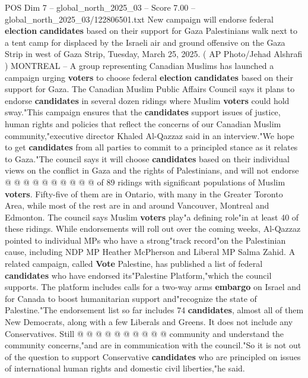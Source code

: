 \begin{textsample}{POS Dim 7 – global\_north\_2025\_03 – Score 7.00 – global\_north\_2025\_03/122806501.txt}  \label{ex:f7_pos_318}
New campaign will endorse federal \textbf{election} \textbf{candidates} based on their support for Gaza Palestinians walk next to a tent camp for displaced by the Israeli air and ground offensive on the Gaza Strip in west of Gaza Strip, Tuesday, March 25, 2025. ( AP Photo/Jehad Alshrafi ) MONTREAL -- A group representing Canadian Muslims has launched a campaign urging \textbf{voters} to choose federal \textbf{election} \textbf{candidates} based on their support for Gaza.
The Canadian Muslim Public Affairs Council says it plans to endorse \textbf{candidates} in several dozen ridings where Muslim \textbf{voters} could hold sway."This campaign ensures that the \textbf{candidates} support issues of justice, human rights and policies that reflect the concerns of our Canadian Muslim community,"executive director Khaled Al-Qazzaz said in an interview."We hope to get \textbf{candidates} from all parties to commit to a principled stance as it relates to Gaza."The council says it will choose \textbf{candidates} based on their individual views on the conflict in Gaza and the rights of Palestinians, and will not endorse @ @ @ @ @ @ @ @ @ @ of 89 ridings with significant populations of Muslim \textbf{voters}.
Fifty-five of them are in Ontario, with many in the Greater Toronto Area, while most of the rest are in and around Vancouver, Montreal and Edmonton.
The council says Muslim \textbf{voters} play"a defining role"in at least 40 of these ridings.
While endorsements will roll out over the coming weeks, Al-Qazzaz pointed to individual MPs who have a strong"track record"on the Palestinian cause, including NDP MP Heather McPherson and Liberal MP Salma Zahid.
A related campaign, called \textbf{Vote} Palestine, has published a list of federal \textbf{candidates} who have endorsed its"Palestine Platform,"which the council supports.
The platform includes calls for a two-way arms \textbf{embargo} on Israel and for Canada to boost humanitarian support and"recognize the state of Palestine."The endorsement list so far includes 74 \textbf{candidates}, almost all of them New Democrats, along with a few Liberals and Greens.
It does not include any Conservatives.
Still @ @ @ @ @ @ @ @ @ @ community and understand the community concerns,"and are in communication with the council."So it is not out of the question to support Conservative \textbf{candidates} who are principled on issues of international human rights and domestic civil liberties,"he said.

\end{textsample}
